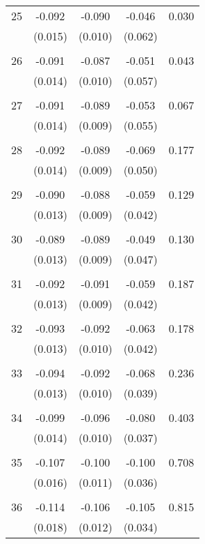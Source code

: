 \begin{tabular}{l*{1}{cccc}}
  25       & -0.092 & -0.090 & -0.046 & 0.030 \\
          & (0.015) & (0.010) & (0.062) & \\
 & & & &\\
  26       & -0.091 & -0.087 & -0.051 & 0.043 \\
          & (0.014) & (0.010) & (0.057) & \\
 & & & &\\
  27       & -0.091 & -0.089 & -0.053 & 0.067 \\
          & (0.014) & (0.009) & (0.055) & \\
 & & & &\\
  28       & -0.092 & -0.089 & -0.069 & 0.177 \\
          & (0.014) & (0.009) & (0.050) & \\
 & & & &\\
  29       & -0.090 & -0.088 & -0.059 & 0.129 \\
          & (0.013) & (0.009) & (0.042) & \\
 & & & &\\
  30       & -0.089 & -0.089 & -0.049 & 0.130 \\
          & (0.013) & (0.009) & (0.047) & \\
 & & & &\\
  31       & -0.092 & -0.091 & -0.059 & 0.187 \\
          & (0.013) & (0.009) & (0.042) & \\
 & & & &\\
  32       & -0.093 & -0.092 & -0.063 & 0.178 \\
          & (0.013) & (0.010) & (0.042) & \\
 & & & &\\
  33       & -0.094 & -0.092 & -0.068 & 0.236 \\
          & (0.013) & (0.010) & (0.039) & \\
 & & & &\\
  34       & -0.099 & -0.096 & -0.080 & 0.403 \\
          & (0.014) & (0.010) & (0.037) & \\
 & & & &\\
  35       & -0.107 & -0.100 & -0.100 & 0.708 \\
          & (0.016) & (0.011) & (0.036) & \\
 & & & &\\
  36       & -0.114 & -0.106 & -0.105 & 0.815 \\
          & (0.018) & (0.012) & (0.034) & \\

\end{tabular}
